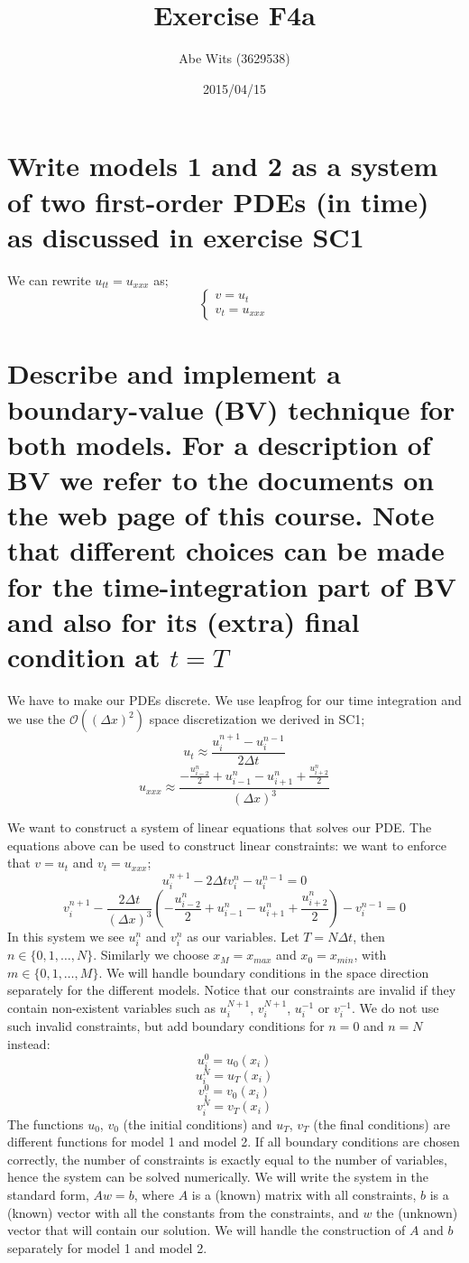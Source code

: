 \documentclass{article}
\renewcommand{\(}{\left(}
\renewcommand{\)}{\right)}
\newcommand{\hot}[1]{\mathcal{O}\(#1\)}
\newcommand{\uin}{u_i^n}
\newcommand{\uinp}{u_i^{n+1}}
\newcommand{\uinm}{u_i^{n-1}}
\newcommand{\uipn}{u_{i+1}^n}
\newcommand{\uimn}{u_{i-1}^n}
\newcommand{\vin}{v_i^n}
\newcommand{\vinp}{v_i^{n+1}}
\newcommand{\vinm}{v_i^{n-1}}
\newcommand{\dt}{\Delta t}
\newcommand{\dx}{\Delta x}
\newcommand{\half}[1]{\frac{{#1}}{2}}
\begin{document}
\title{Exercise F4a}
\author{Abe Wits (3629538)}
\date{2015/04/15}%

\maketitle

\setlength{\parskip}{0.2 cm}
\setlength{\parindent}{0.0 cm}

\section*{Write models 1 and 2 as a system of two first-order PDEs (in time) as discussed in exercise \textbf{SC1}}
We can rewrite $u_{tt} = u_{xxx}$ as;
$$
\begin{cases}
v = u_t\\
v_t = u_{xxx}
\end{cases}
$$

\section*{Describe and implement a boundary-value (BV) technique for both models. For a description of BV we refer to the documents on the web page of this course. Note that different choices can be made for the time-integration part of BV and also for its (extra) final condition at $t=T$}
We have to make our PDEs discrete. We use leapfrog for our time integration and we use the $\hot{(\dx)^2}$ space discretization we derived in SC1;
$$u_t \approx \frac{\uinp - \uinm}{2\dt}$$
$$u_{xxx} \approx \frac{-\half{u_{i-2}^n}+\uimn-\uipn+\half{u_{i+2}^n}}{(\dx)^3}$$

We want to construct a system of linear equations that solves our PDE. The equations above can be used to construct linear constraints: we want to enforce that $v=u_t$ and $v_t=u_{xxx}$;
$$\uinp-2\dt\vin-\uinm = 0$$
$$\vinp-\frac{2\dt}{(\dx)^3}\(-\half{u_{i-2}^n}+\uimn-\uipn+\half{u_{i+2}^n}\)-\vinm = 0$$
In this system we see $\uin$ and $\vin$ as our variables. Let $T = N\dt$, then $n\in\{0,1,\dots,N\}$. Similarly we choose $x_M=x_{max}$ and $x_0=x_{min}$, with $m \in \{0,1,\dots,M\}$. We will handle boundary conditions in the space direction separately for the different models.
Notice that our constraints are invalid if they contain non-existent variables such as $u_i^{N+1}$, $v_i^{N+1}$, $u_i^{-1}$ or $v_i^{-1}$. We do not use such invalid constraints, but add boundary conditions for $n=0$ and $n=N$ instead:
$$u_i^0 = u_0(x_i)$$
$$u_i^N = u_T(x_i)$$
$$v_i^0 = v_0(x_i)$$
$$v_i^N = v_T(x_i)$$
The functions $u_0$, $v_0$ (the initial conditions)  and $u_T$, $v_T$ (the final conditions) are different functions for model 1 and model 2.
If all boundary conditions are chosen correctly, the number of constraints is exactly equal to the number of variables, hence the system can be solved numerically. We will write the system in the standard form, $A w = b$, where $A$ is a (known) matrix with all constraints, $b$ is a (known) vector with all the constants from the constraints, and $w$ the (unknown) vector that will contain our solution. We will handle the construction of $A$ and $b$ separately for model 1 and model 2.
\end{document}
